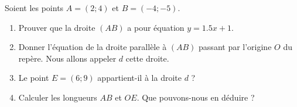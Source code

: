 
\begin{exercice}\label{exosmath-0603}

    Soient les points \( A=(2;4)\) et \( B=(-4;-5)\).
    \begin{enumerate}
        \item
            Prouver que la droite \( (AB)\) a pour équation \( y=1.5x+1\).
        \item
            Donner l'équation de la droite parallèle à \( (AB)\) passant par l'origine \( O\) du repère. Nous allons appeler \(d\) cette droite.
        \item
            Le point \( E=(6;9)\) appartient-il à la droite \( d\) ?
        \item
            Calculer les longueurs \( AB\) et \( OE\). Que pouvons-nous en déduire ?
    \end{enumerate}

\end{exercice}
